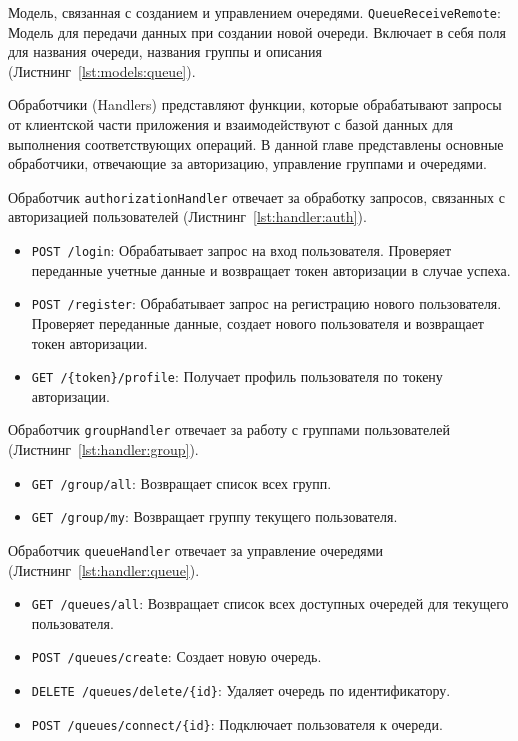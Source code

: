 Модель, связанная с созданием и управлением очередями.
\texttt{QueueReceiveRemote}: Модель для передачи данных
при создании новой очереди. Включает в себя поля для названия очереди,
названия группы и описания
(Листнинг~\ref{lst:models:queue}).


Обработчики (Handlers) представляют функции,
которые обрабатывают запросы от клиентской части приложения
и взаимодействуют с базой данных для выполнения соответствующих операций.
В данной главе представлены основные обработчики, отвечающие за авторизацию,
управление группами и очередями.

Обработчик \texttt{authorizationHandler} отвечает за обработку запросов,
связанных с авторизацией пользователей
(Листнинг~\ref{lst:handler:auth}).

\begin{itemize}
    \item \texttt{POST /login}: Обрабатывает запрос на вход пользователя.
		Проверяет переданные учетные данные и возвращает токен авторизации
		в случае успеха.
    \item \texttt{POST /register}: Обрабатывает запрос на регистрацию нового
		пользователя. Проверяет переданные данные,
		создает нового пользователя и возвращает токен авторизации.
    \item \texttt{GET /\{token\}/profile}: Получает профиль пользователя
		по токену авторизации.
\end{itemize}

Обработчик \texttt{groupHandler} отвечает за работу с группами пользователей
(Листнинг~\ref{lst:handler:group}).

\begin{itemize}
    \item \texttt{GET /group/all}: Возвращает список всех групп.
    \item \texttt{GET /group/my}: Возвращает группу текущего пользователя.
\end{itemize}

Обработчик \texttt{queueHandler} отвечает за управление очередями
(Листнинг~\ref{lst:handler:queue}).

\begin{itemize}
    \item \texttt{GET /queues/all}: Возвращает список всех доступных очередей
		для текущего пользователя.
    \item \texttt{POST /queues/create}: Создает новую очередь.
    \item \texttt{DELETE /queues/delete/\{id\}}:
		Удаляет очередь по идентификатору.
    \item \texttt{POST /queues/connect/\{id\}}:
		Подключает пользователя к очереди.
\end{itemize}

